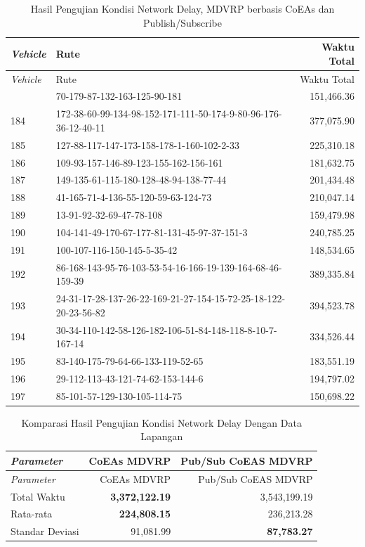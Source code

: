 \begin{longtable}[!]{lp{8cm}r}
	\caption{Hasil Pengujian Kondisi Network Delay, MDVRP berbasis CoEAs dan Publish/Subscribe}
	\label{tbl:test_result_network_delay_field_pubsub_coes}\\
	\toprule
	\textit{Vehicle} & Rute & Waktu Total\\ 
	\midrule
	\endfirsthead
	\toprule
	\textit{Vehicle} & Rute & Waktu Total\\ 
	\midrule
	\endhead
	\bottomrule
	\endfoot
	183 & 70-179-87-132-163-125-90-181 & 151,466.36 \\
	184 & 172-38-60-99-134-98-152-171-111-50-174-9-80-96-176-36-12-40-11 & 377,075.90 \\
	185 & 127-88-117-147-173-158-178-1-160-102-2-33 & 225,310.18 \\
	186 & 109-93-157-146-89-123-155-162-156-161 & 181,632.75 \\
	187 & 149-135-61-115-180-128-48-94-138-77-44 & 201,434.48 \\
	188 & 41-165-71-4-136-55-120-59-63-124-73 & 210,047.14 \\
	189 & 13-91-92-32-69-47-78-108 & 159,479.98 \\
	190 & 104-141-49-170-67-177-81-131-45-97-37-151-3 & 240,785.25 \\
	191 & 100-107-116-150-145-5-35-42 & 148,534.65 \\
	192 & 86-168-143-95-76-103-53-54-16-166-19-139-164-68-46-159-39 & 389,335.84 \\
	193 & 24-31-17-28-137-26-22-169-21-27-154-15-72-25-18-122-20-23-56-82 & 394,523.78 \\
	194 & 30-34-110-142-58-126-182-106-51-84-148-118-8-10-7-167-14 & 334,526.44 \\
	195 & 83-140-175-79-64-66-133-119-52-65 & 183,551.19 \\
	196 & 29-112-113-43-121-74-62-153-144-6 & 194,797.02 \\
	197 & 85-101-57-129-130-105-114-75 & 150,698.22 \\
\end{longtable}


\begin{longtable}[!]{lrr}
	\caption{Komparasi Hasil Pengujian Kondisi Network Delay Dengan Data Lapangan}
	\label{tbl:test_result_network_delay_field_comparison}\\
	\toprule
	\textit{Parameter} & CoEAs MDVRP  & Pub/Sub CoEAS MDVRP\\ 
	\midrule
	\endfirsthead
	\toprule
	\textit{Parameter} & CoEAs MDVRP  & Pub/Sub CoEAS MDVRP\\ 
	\midrule
	\endhead
	\bottomrule
	\endfoot
	Total Waktu & \textbf{3,372,122.19} & 3,543,199.19\\
	Rata-rata & \textbf{224,808.15} & 236,213.28\\
	Standar Deviasi & 91,081.99 & \textbf{87,783.27}\\
\end{longtable}


